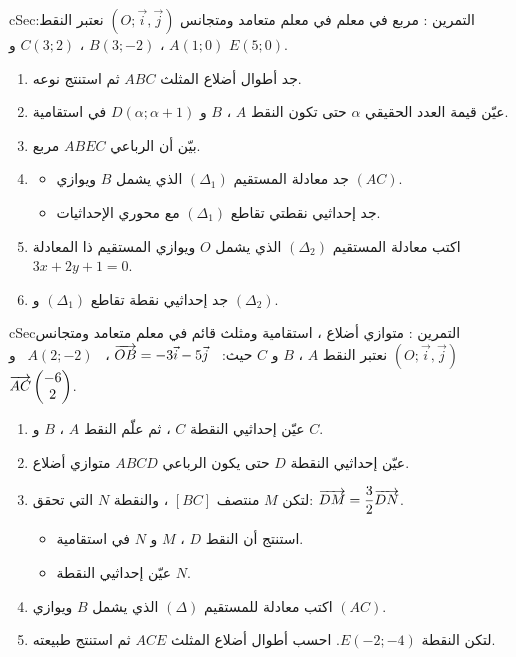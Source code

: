 \documentclass[12pt,a4paper]{article}
\newenvironment{BOX}[2]{\begin{otherlanguage}{english}\begin{arbox}{#1}{#2}}{\end{arbox}\end{otherlanguage}}
\newcounter{exo}
\newenvironment{tamrin}[1]{\stepcounter{exo}\begin{BOX}{cSec}{التمرين \theexo: #1}}{\end{BOX}}
\newenvironment{sq}{\begin{itemize}[leftmargin=2.4em,itemsep=3pt]}{\end{itemize}}
\newcommand{\qa}{\item[(أ)]}\newcommand{\qb}{\item[(ب)]}\newcommand{\qc}{\item[(جـ)]}\newcommand{\qd}{\item[(د)]}\newcommand{\qe}{\item[(هـ)]}
\begin{document}
\begin{tamrin}{مربع في معلم}
في معلم متعامد ومتجانس $(O;\vec i,\vec j)$ نعتبر النقط: $A(1;0)$ ، $B(3;-2)$ ، $C(3;2)$ و $E(5;0)$.
\begin{enumerate}
\item جد أطوال أضلاع المثلث $ABC$ ثم استنتج نوعه.
\item عيّن قيمة العدد الحقيقي $\alpha$ حتى تكون النقط $A$ ، $B$ و $D(\alpha;\alpha+1)$ في استقامية.
\item بيّن أن الرباعي $ABEC$ مربع.
\item
\begin{sq}
\qa جد معادلة المستقيم $(\Delta_1)$ الذي يشمل $B$ ويوازي $(AC)$.
\qb جد إحداثيي نقطتي تقاطع $(\Delta_1)$ مع محوري الإحداثيات.
\end{sq}
\item اكتب معادلة المستقيم $(\Delta_2)$ الذي يشمل $O$ ويوازي المستقيم ذا المعادلة $3x+2y+1=0$.
\item جد إحداثيي نقطة تقاطع $(\Delta_1)$ و $(\Delta_2)$.
\end{enumerate}
\end{tamrin}

\begin{tamrin}{متوازي أضلاع ، استقامية ومثلث قائم}
في معلم متعامد ومتجانس $(O;\vec i,\vec j)$ نعتبر النقط $A$ ، $B$ و $C$ حيث: \ $\V{OB}=-3\vec i-5\vec j$ ، \ $A(2;-2)$ \ و \ $\V{AC}\cp{-6}{2}$.
\begin{enumerate}
\item عيّن إحداثيي النقطة $C$ ، ثم علّم النقط $A$ ، $B$ و $C$.
\item عيّن إحداثيي النقطة $D$ حتى يكون الرباعي $ABCD$ متوازي أضلاع.
\item لتكن $M$ منتصف $[BC]$ ، والنقطة $N$ التي تحقق: $\V{DM}=\dfrac32\V{DN}$.
\begin{sq}
\qa استنتج أن النقط $D$ ، $M$ و $N$ في استقامية.
\qb عيّن إحداثيي النقطة $N$.
\end{sq}
\item اكتب معادلة للمستقيم $(\Delta)$ الذي يشمل $B$ ويوازي $(AC)$.
\item لتكن النقطة $E(-2;-4)$. احسب أطوال أضلاع المثلث $ACE$ ثم استنتج طبيعته.
\end{enumerate}
\end{tamrin}

\end{document}
